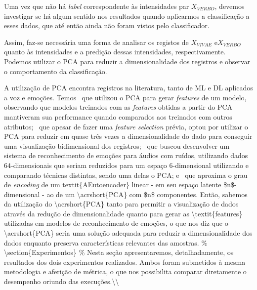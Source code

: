 Uma vez que não há \textit{label} correspondente às intensidades par $X_{VERBO}$, devemos investigar se há algum sentido nos resultados quando aplicarmos a classificação a esses dados, que até então ainda não foram vistos pelo classificador.

Assim, faz-se necessária uma forma de analisar os registos de $X_{VIVAE}$ e$X_{VERBO}$ quanto às intensidades e a predição dessas intensidades, respectivamente. Podemos utilizar o \acrshort{PCA} para reduzir a dimensionalidade dos registros e observar o comportamento da classificação.

A utilização de \acrshort{PCA} encontra registros na literatura, tanto de \acrshort{ML} e \acrshort{DL} aplicados a voz e emoções. Temos~\cite{pca1} que utilizou o \acrshort{PCA} para gerar \textit{features} de um modelo, observando que modelos treinados com as \textit{features} obtidas a partir do \acrshort{PCA} mantiveram sua performance quando comparados aos treinados com outros atributos;~\cite{pca2} que apesar de fazer uma \textit{feature selection} prévia, optou por utilizar o \acrshort{PCA} para reduzir em quase três vezes a dimensionalidade do dado para conseguir uma visualização bidimensional dos registros;~\cite{pca3} que buscou desenvolver um sistema de reconhecimento de emoções para áudios com ruídos, utilizando dados $64$-dimensionais que seriam reduzidos para um espaço $6$-dimensional utilizando e comparando técnicas distintas, sendo uma delas o \acrshort{PCA}; e~\cite{pca5} que aproxima o grau de \textit{encoding} de um \acrlong{textit{AEutoencoder} linear - em seu espaço latente $n$-dimensional - ao de um \acrshort{PCA} com $n$ componentes.

Então, sabemos  da utilização do \acrshort{PCA} tanto para permitir a visualização de dados através da redução de dimensionalidade quanto para gerar as \textit{features} utilizadas em modelos de reconhecimento de emoções, o que nos diz que o \acrshort{PCA} seria uma solução adequada para reduzir a dimensionalidade dos dados enquanto preserva características relevantes das amostras.




}
